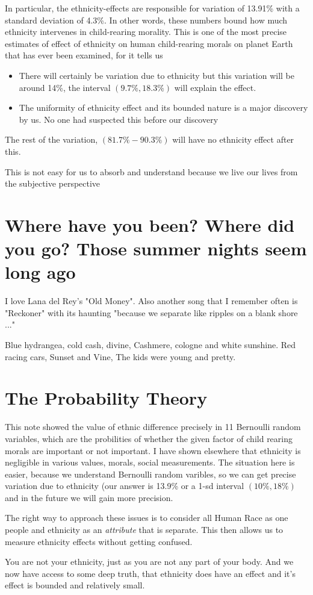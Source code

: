 \documentclass{amsart}
\begin{document}
In particular, the ethnicity-effects are responsible for variation of 13.91\% with a standard deviation of 4.3\%.  In other words, these numbers bound how much ethnicity intervenes in child-rearing morality.  This is one of the most precise estimates of effect of ethnicity on human child-rearing morals on planet Earth that has ever been examined, for it tells us 
\begin{itemize}
\item There will certainly be variation due to ethnicity but this variation will be around 14\%, the interval $( 9.7\%, 18.3\%)$ will explain 
the effect.  
\item{The uniformity of ethnicity effect and its bounded nature is a major discovery by us.  No one had suspected this before our discovery}
\end{itemize}


The rest of the variation, $(81.7\%-90.3\%)$ will have no ethnicity effect after this.  

This is not easy for us to absorb and understand because we live our lives from the subjective perspective

\section{Where have you been? Where did you go?
Those summer nights seem long ago}

I love Lana del Rey's "Old Money".  Also another song that I remember often is "Reckoner" with its haunting "because we separate like ripples on a blank shore ..."  

Blue hydrangea, cold cash, divine,
Cashmere, cologne and white sunshine.
Red racing cars, Sunset and Vine,
The kids were young and pretty.

\section{The Probability Theory}
This note showed the value of ethnic difference precisely in 11 Bernoulli random variables, which are the probilities of whether the given factor of child rearing morals are important or not important.  I have shown elsewhere that ethnicity is negligible in various values, morals, social measurements.  The situation here is easier, because we understand Bernoulli random varibles, so we can get precise variation due to ethnicity (our answer is 13.9\% or a 1-sd interval $(10\%,18\%)$ and in the future we will gain more precision. 

The right way to approach these issues is to consider all Human Race as one people and ethnicity as an {\em attribute} that is separate.  This then allows us to measure ethnicity effects without getting confused.

You are not your ethnicity, just as you are not any part of your body.  And we now have access to some deep truth, that ethnicity does have an effect and it's effect is bounded and relatively small.
 
\end{document}
